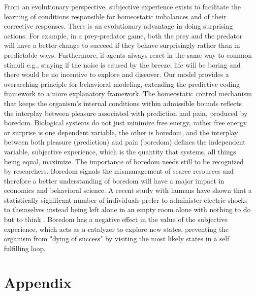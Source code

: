 \documentclass[11pt, onecolumn]{article}
\newcommand{\myreferences}{C:/workspace/github/bibliography-jgr/bibliojgr}
\begin{document}
From an evolutionary perspective, subjective experience exists to facilitate
the learning of conditions responsible for homeostatic imbalances and
of their corrective responses. There is an evolutionary advantage in doing
surprising actions. For example, in a prey-predator game, both the prey and
the predator will have a better change to succeed if they behave surprisingly
rather than in predictable ways. Furthermore, if agents always react in the
same way to common stimuli e.g., staying if the noise is caused by the breeze, life will be boring and there would be no incentive to explore and discover.
Our model provides a overarching principle for behavioral modeling, extending the predictive coding framework to a more explanatory framework. The homeostatic control mechanism that keeps the organism's internal conditions within admissible bounds reflects the interplay between pleasure associated with prediction and pain, produced by boredom.
Biological systems do not just minimize free energy, rather free energy or surprise is one dependent variable, the other is boredom, and the interplay between both pleasure (prediction) and pain (boredom) defines the independent variable, subjective experience, which is the quantity that systems, all things being equal, maximize. 
The importance of boredom needs still to be recognized by researchers. Boredom signals the mismanagement of scarce resources and therefore a better  understanding of boredom will have a major impact in economics and behavioral science. A recent study with humans have shown that a statistically significant number of individuals prefer to administer electric shocks to themselves instead being left alone in an empty room alone with nothing to do but to think \citep{wilson_just_2014}. Boredom has a negative effect in the value of the subjective experience, which acts as a catalyzer to explore new states, preventing the organism from "dying of success" by visiting the most likely states  in a self fulfilling loop. 




%


\newpage
\section*{Appendix}
\label{se:ap}
\end{document}
